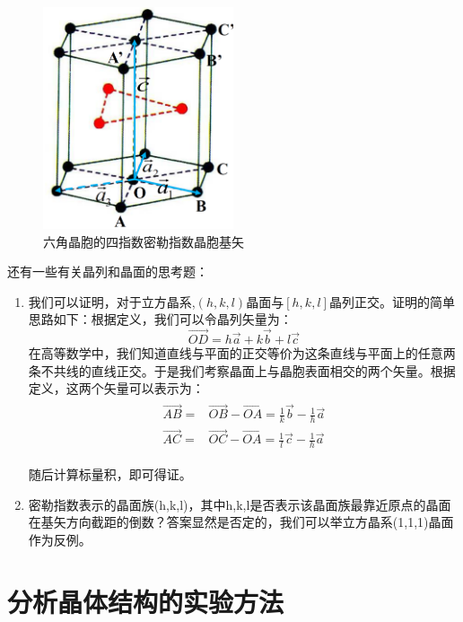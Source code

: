 \documentclass{ctexart}
\begin{document}
        \begin{figure}[H]
        \centering
        \includegraphics[width=0.5\textwidth]{figure/Hexagonal system2.png}
        \caption{六角晶胞的四指数密勒指数晶胞基矢}
        \label{fig:hexagonalsystem2}
    \end{figure}
    
    还有一些有关晶列和晶面的思考题：
    \begin{enumerate}
        \item 我们可以证明，对于立方晶系,$(h,k,l)$晶面与$[h,k,l]$晶列正交。证明的简单思路如下：根据定义，我们可以令晶列矢量为：
       \begin{equation}
            \Vec{OD}=h\Vec{a}+k\Vec{b}+l\Vec{c}
       \end{equation} 
       在高等数学中，我们知道直线与平面的正交等价为这条直线与平面上的任意两条不共线的直线正交。于是我们考察晶面上与晶胞表面相交的两个矢量。根据定义，这两个矢量可以表示为：
       \begin{align}
       \begin{split}
           \Vec{AB}=&\Vec{OB}-\Vec{OA}=\frac{1}{k}\Vec{b}-\frac{1}{h}\Vec{a}\\
           \Vec{AC}=&\Vec{OC}-\Vec{OA}=\frac{1}{l}\Vec{c}-\frac{1}{h}\Vec{a}
       \end{split}
       \end{align}
       
       随后计算标量积，即可得证。
       \item 密勒指数表示的晶面族(h,k,l)，其中h,k,l是否表示该晶面族最靠近原点的晶面在基矢方向截距的倒数？答案显然是否定的，我们可以举立方晶系(1,1,1)晶面作为反例。
    \end{enumerate}
    
    \newpage
    \section{分析晶体结构的实验方法}
\end{document}
